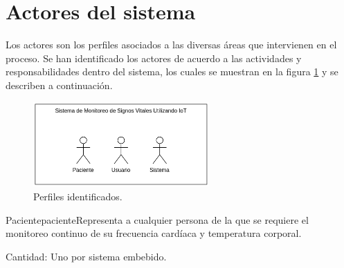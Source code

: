 \section{Actores del sistema}

Los actores son los perfiles asociados a las diversas áreas que intervienen en el proceso. Se han identificado los actores de acuerdo a las actividades y responsabilidades dentro del sistema, los cuales se muestran en la figura \ref{fig:perfiles} y se describen a continuación.


    \begin{figure}[htbp!]
      \begin{center}
      \includegraphics[width=0.6\textwidth]{ModeloComportamiento/imagenes/Actores.png}
      \caption{Perfiles identificados.}
      \label{fig:perfiles}
      \end{center}
    \end{figure}

\begin{actor}{Paciente}{paciente}{Representa a cualquier persona de la que se requiere el monitoreo continuo de su frecuencia cardíaca y temperatura corporal.}

	\item[Cantidad:] Uno por sistema embebido.

\end{actor}
%
%	
%	
%
%	
